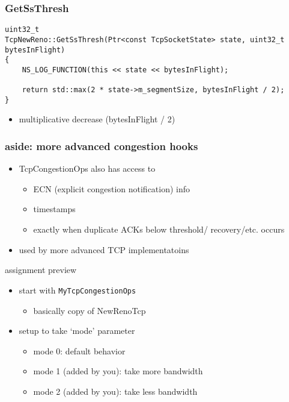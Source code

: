 \begin{FragileFrame}
\frametitle{GetSsThresh}
\begin{Verbatim}[fontsize=\fontsize{9}{10}]
uint32_t
TcpNewReno::GetSsThresh(Ptr<const TcpSocketState> state, uint32_t bytesInFlight)
{
    NS_LOG_FUNCTION(this << state << bytesInFlight);
 
    return std::max(2 * state->m_segmentSize, bytesInFlight / 2);
}
\end{Verbatim}
\begin{itemize}
\item multiplicative decrease (bytesInFlight / 2)
\end{itemize}
\end{FragileFrame}

\begin{frame}\frametitle{aside: more advanced congestion hooks}
\begin{itemize}
\item TcpCongestionOps also has access to
    \begin{itemize}
    \item ECN (explicit congestion notification) info
    \item timestamps
    \item exactly when duplicate ACKs below threshold/ recovery/etc. occurs
    \end{itemize}
\item used by more advanced TCP implementatoins
\end{itemize}
\end{frame}

\begin{frame}{assignment preview}
\begin{itemize}
\item start with \texttt{MyTcpCongestionOps}
    \begin{itemize}
    \item basically copy of NewRenoTcp
    \end{itemize}
\item setup to take `mode' parameter
    \begin{itemize}
    \item mode 0: default behavior
    \item mode 1 (added by you): take more bandwidth
    \item mode 2 (added by you): take less bandwidth
    \end{itemize}
\end{itemize}
\end{frame}
